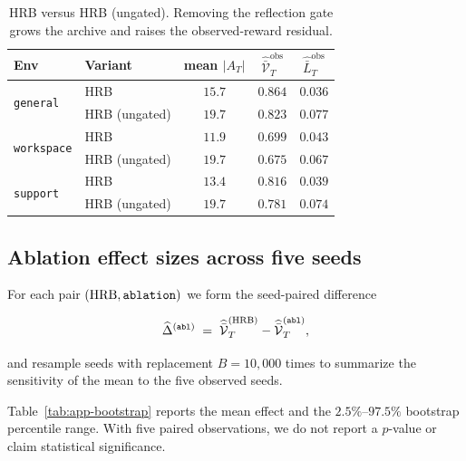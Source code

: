 \documentclass{article} %
\begin{document}
\begin{table}[h]
\centering
\small
\begin{tabular}{llccc}
\toprule
Env & Variant & mean $|A_T|$ & $\widehat{\bar{\mathcal V}}_T^{\mathrm{obs}}$ & $\widehat{\bar L}_T^{\mathrm{obs}}$ \\
\midrule
\multirow{2}{*}{\texttt{general}}
 & HRB           & $15.7$ & $0.864$ & $0.036$ \\
 & HRB (ungated) & $19.7$ & $0.823$ & $0.077$ \\
\midrule
\multirow{2}{*}{\texttt{workspace}}
 & HRB           & $11.9$ & $0.699$ & $0.043$ \\
 & HRB (ungated) & $19.7$ & $0.675$ & $0.067$ \\
\midrule
\multirow{2}{*}{\texttt{support}}
 & HRB           & $13.4$ & $0.816$ & $0.039$ \\
 & HRB (ungated) & $19.7$ & $0.781$ & $0.074$ \\
\bottomrule
\end{tabular}
\caption{HRB versus HRB (ungated). Removing the reflection gate grows the archive
and raises the observed-reward residual.}
\label{tab:app-ungated}
\end{table}

\subsection{Ablation effect sizes across five seeds}

\label{app:tab-bootstrap}

For each pair $(\textnormal{HRB},\texttt{ablation})$ we form the seed-paired difference

\begin{equation}
\label{eq:app-tab-effect}
\widehat\Delta^{(\texttt{abl})} \;=\; \widehat{\bar{\mathcal V}}_T^{(\textnormal{HRB})} - \widehat{\bar{\mathcal V}}_T^{(\texttt{abl})},
\end{equation}

and resample seeds with replacement \(B=10{,}000\) times to summarize the
sensitivity of the mean to the five observed seeds.

Table~\ref{tab:app-bootstrap} reports the mean effect and the \(2.5\%\)--\(97.5\%\)
bootstrap percentile range. With five paired observations, we do not report a
\(p\)-value or claim statistical significance.
\end{document}
